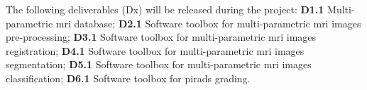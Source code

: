 \begin{itemize}[noitemsep]
\end{itemize}

The following deliverables (Dx) will be released during the project:
\textbf{D1.1} Multi-parametric \ac{mri} database;
\textbf{D2.1} Software toolbox for multi-parametric \ac{mri} images pre-processing;
\textbf{D3.1} Software toolbox for multi-parametric \ac{mri} images registration;
\textbf{D4.1} Software toolbox for multi-parametric \ac{mri} images segmentation;
\textbf{D5.1} Software toolbox for multi-parametric \ac{mri} images classification;
\textbf{D6.1} Software toolbox for \ac{pirads} grading.


